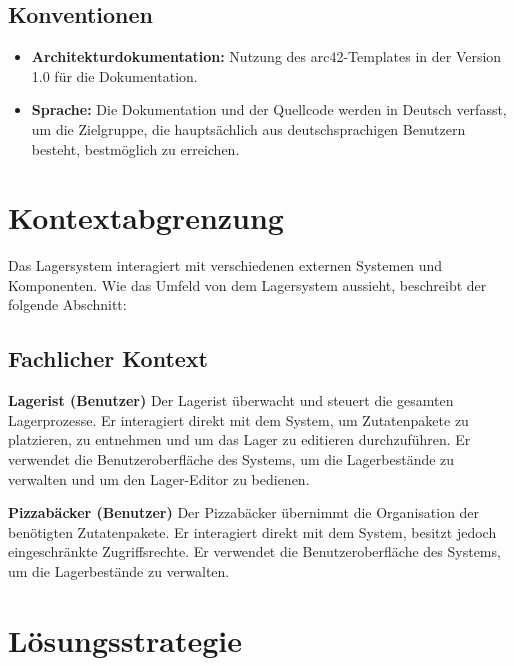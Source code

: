 \subsection{Konventionen}\label{subsec: konventionen}

\begin{itemize}
    \item \textbf{Architekturdokumentation:} Nutzung des arc42-Templates in der Version 1.0 für die Dokumentation.
    \item \textbf{Sprache:} Die Dokumentation und der Quellcode werden in Deutsch verfasst, um die Zielgruppe, die hauptsächlich aus deutschsprachigen Benutzern besteht, bestmöglich zu erreichen.
\end{itemize}

\section{Kontextabgrenzung}\label{sec: kontextabgrenzung}
Das Lagersystem interagiert mit verschiedenen externen Systemen und Komponenten. Wie das Umfeld von dem Lagersystem aussieht, beschreibt der folgende Abschnitt:

\subsection{Fachlicher Kontext}\label{subsec: fachlicher-kontext}

\textbf{Lagerist (Benutzer)}
Der Lagerist überwacht und steuert die gesamten Lagerprozesse. Er interagiert direkt mit dem System, um Zutatenpakete zu platzieren, zu entnehmen und um das Lager zu editieren durchzuführen. Er verwendet die Benutzeroberfläche des Systems, um die Lagerbestände zu verwalten und um den Lager-Editor zu bedienen.

\textbf{Pizzabäcker (Benutzer)}
Der Pizzabäcker übernimmt die Organisation der benötigten Zutatenpakete. Er interagiert direkt mit dem System, besitzt jedoch eingeschränkte Zugriffsrechte. Er verwendet die Benutzeroberfläche des Systems, um die Lagerbestände zu verwalten.


\section{Lösungsstrategie}

